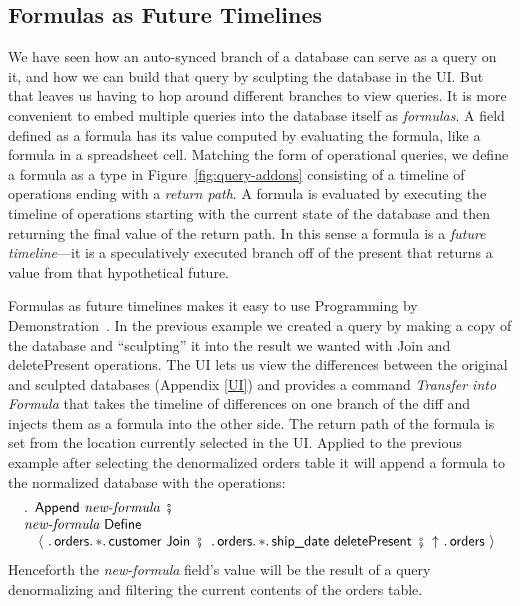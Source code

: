 \documentclass[english,submission]{programming}
\theoremstyle{definition}
\DeclareMathOperator{\exec}{\ \fatsemi\ \ }
\begin{document}
\subsection{Formulas as Future Timelines}\label{formulas}

We have seen how an auto-synced branch of a database can serve as a query on it, and how we can build that query by sculpting the database in the UI. But that leaves us having to hop around different branches to view queries. It is more convenient to embed multiple queries into the database itself as \textit{formulas}. A field defined as a formula has its value computed by evaluating the formula, like a formula in a spreadsheet cell. Matching the form of operational queries, we define a formula as a type in Figure~\ref{fig:query-addons} consisting of a timeline of operations ending with a \textit{return path}. A formula is evaluated by executing the timeline of operations starting with the current state of the database and then returning the final value of the return path. In this sense a formula is a \textit{future timeline}---it is a speculatively executed branch off of the present that returns a value from that hypothetical future.

Formulas as future timelines makes it easy to use Programming by Demonstration~\cite{cypher93-pbd}. In the previous example we created a query by making a copy of the database and ``sculpting'' it into the result we wanted with \textsf{Join} and \textsf{deletePresent} operations. The UI lets us view the differences between the original and sculpted databases (Appendix \ref{UI}) and provides a command \textit{Transfer into Formula} that takes the timeline of differences on one branch of the diff and injects them as a formula into the other side. The return path of the formula is set from the location currently selected in the UI. Applied to the previous example after selecting the denormalized \textsf{orders} table it will append a formula to the normalized database with the operations:
\[
\begin{array}{l}
  \ldotp \textsf{ Append } \textit{new-formula} \exec\\
  \textit{new-formula} \textsf{ Define } \\
  \quad \langle
\ \ldotp \textsf{orders}\ldotp * \ldotp \textsf{customer Join} \exec
\ldotp \textsf{orders}\ldotp * \ldotp \textsf{ship\_date deletePresent} \exec
\!\!\uparrow \ \ldotp \textsf{orders}\
  \rangle\\
\end{array}
\]
Henceforth the \textit{new-formula} field's value will be the result of a query  denormalizing and filtering the current contents of the orders table.
\end{document}
